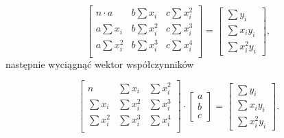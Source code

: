 \documentclass[12pt,a4paper]{article}
\begin{document}
\[
	\left[ \begin{array}{ccc}
		n\cdot a & b\sum x_i & c\sum x_i^2 \\
		a \sum x_i & b\sum x_i^2 & c\sum x_i^3 \\
		a \sum x_i^2 & b\sum x_i^3 & c\sum x_i^4 \\
	\end{array}\right] =
	\left[ \begin{array}{c}
		\sum y_i \\ 
		\sum x_i y_i \\
		\sum x_i^2 y_i
	\end{array}\right],
\]
następnie wyciągnąć wektor współczynników

\[
	\left[ \begin{array}{ccc}
		n & \sum x_i & \sum x_i^2 \\
		\sum x_i & \sum x_i^2 & \sum x_i^3 \\
		\sum x_i^2 & \sum x_i^3 & \sum x_i^4 \\
	\end{array}\right] \cdot 
	\left[ \begin{array}{c}
		a \\
		b \\
		c
	\end{array}\right]
	=
	\left[ \begin{array}{c}
		\sum y_i \\ 
		\sum x_i y_i \\
		\sum x_i^2 y_i
	\end{array}\right].
\]
\end{document}
